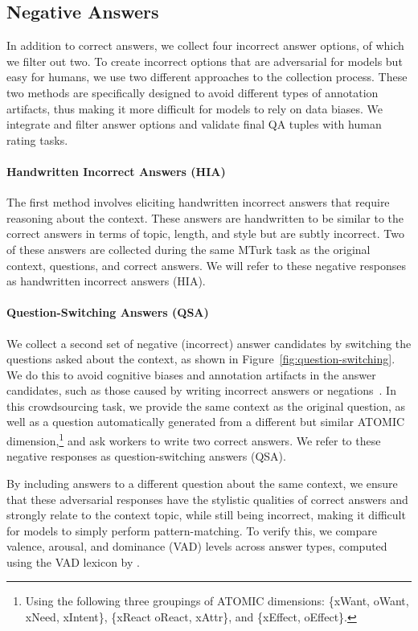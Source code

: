 \subsection{Negative Answers}

In addition to correct answers, we collect four incorrect answer options, of which we filter out two. To create incorrect options that are adversarial for models but easy for humans, we use two different approaches to the collection process. These two methods are specifically designed to avoid different types of annotation artifacts, thus making it more difficult for models to rely on data biases. We integrate and filter answer options and validate final QA tuples with human rating tasks.

\paragraph{Handwritten Incorrect Answers (HIA)} The first method involves eliciting handwritten incorrect answers that require reasoning about the context.  These answers are handwritten to be similar to the correct answers in terms of topic, length, and style but are subtly incorrect.  Two of these answers are collected during the same MTurk task as the original context, questions, and correct answers. We will refer to these negative responses as handwritten incorrect answers (HIA).

\paragraph{Question-Switching Answers (QSA)}
\label{sec:qsa}
We collect a second set of negative (incorrect) answer candidates by switching the questions asked about the context, as shown in Figure~\ref{fig:question-switching}.
We do this to avoid cognitive biases and annotation artifacts in the answer candidates, such as those caused by writing incorrect answers or negations~\cite{Schwartz2017effect,Gururangan2018AnnotationAI}. In this crowdsourcing task, we provide the same context as the original question, as well as a question automatically generated from a different but similar ATOMIC dimension,\footnote{Using the following three groupings of ATOMIC dimensions: \{xWant, oWant, xNeed, xIntent\}, \{xReact oReact, xAttr\}, and \{xEffect, oEffect\}.} and ask workers to write two correct answers.  We refer to these negative responses as question-switching answers (QSA).

By including answers to a different question about the same context, we ensure that these adversarial responses have the stylistic qualities of correct answers and strongly relate to the context topic, while still being incorrect, making it difficult for models to simply perform pattern-matching. To verify this, we compare valence, arousal, and dominance (VAD) levels across answer types, computed using the VAD lexicon by \citet[][]{mohammad2018NRC-VAD}.

